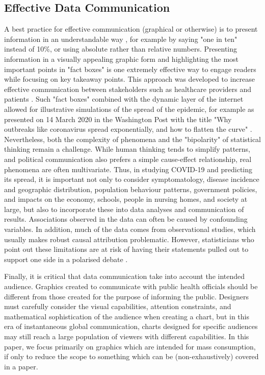 \documentclass[article]{jdssv}\usepackage[]{graphicx}\usepackage[]{xcolor}
\begin{document}
\subsection{Effective Data Communication}
A best practice for effective communication (graphical or otherwise) is to present information in an understandable way \citep{gigerenzerHelpingDoctorsPatients2007,gigerenzerWhatAreNatural2011}, for example by saying "one in ten" instead of 10\%, or using absolute rather than relative numbers. 
Presenting information in a visually appealing graphic form and highlighting the most important points in "fact boxes" is one extremely effective way to engage readers while focusing on key takeaway points. 
This approach was developed to increase effective communication between stakeholders such as healthcare providers and patients \citep{FaktenboxenZurMRNASchutzimpfung}. 
Such "fact boxes" combined with the dynamic layer of the internet allowed for illustrative simulations of the spread of the epidemic, for example as presented on 14 March 2020 in the Washington Post with the title "Why outbreaks like coronavirus spread exponentially, and how to flatten the curve" \citep{stevensTheseSimulationsShow2020}.  Nevertheless, both the complexity of phenomena and the "bipolarity" of statistical thinking remain a challenge. 
While human thinking tends to simplify patterns, and political communication also prefers a simple cause-effect relationship, real phenomena are often multivariate. 
Thus, in studying COVID-19 and predicting its spread, it is important not only to consider symptomatology, disease incidence and geographic distribution, population behaviour patterns, government policies, and impacts on the economy, schools, people in nursing homes, and society at large, but also to incorporate these into data analyses and communication of results. 
Associations observed in the data can often be caused by confounding variables. 
In addition, much of the data comes from observational studies, which usually makes robust causal attribution problematic. 
However, statisticians who point out these limitations are at risk of having their statements pulled out to support one side in a polarised debate \citep{McConway2021}.

Finally, it is critical that data communication take into account the intended audience. Graphics created to communicate with public health officials should be different from those created for the purpose of informing the public. Designers must carefully consider the visual capabilities, attention constraints, and mathematical sophistication of the audience when creating a chart, but in this era of instantaneous global communication, charts designed for specific audiences may still reach a large population of viewers with different capabilities. In this paper, we focus primarily on graphics which are intended for mass consumption, if only to reduce the scope to something which can be (non-exhaustively) covered in a paper.
\end{document}
